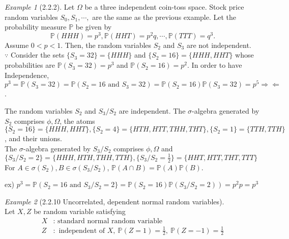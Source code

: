 \documentclass[12pt]{report}
\renewcommand{\1}{\mathbb{1}}
\theoremstyle{break}
\theoremstyle{newdef}
\theoremstyle{remark}
\newtheorem*{exmp}{Example} %
\begin{document}
\begin{appendices}
\vspace{5mm}

\begin{exmp}[2.2.2]
Let $\Omega$ be a three independent coin-toss space.
Stock price random variables $S_0, S_1, \cdots,$ are the same as the previous example.
Let the probability measure $\mathbb{P}$ be given by
$$\mathbb{P}(HHH) = p^3, \mathbb{P}(HHT) = p^2q, \cdots, \mathbb{P}(TTT) = q^3.$$
Assume $0 < p < 1$.
Then, the random variables $S_2$ and $S_3$ are not independent.\\
$\because$ Consider the sets $\{S_3 = 32\} = \{ HHH \}$ and $\{S_2 = 16\} = \{HHH, HHT \}$ whose probabilities are
$\mathbb{P}(S_3 = 32) = p^3$ and $\mathbb{P}(S_2 = 16) = p^2$.
In order to have Independence, $p^3 = \mathbb{P}(S_3 = 32) = \mathbb{P}(S_2 = 16 \text{ and } S_3 = 32) = \mathbb{P}(S_2 = 16)\mathbb{P}(S_3 = 32) = p^5\Rightarrow\!\Leftarrow$.

The random variables $S_2$ and $S_3/S_2$ are independent.
The $\sigma$-algebra generated by $S_2$ comprises $\phi, \Omega$, the atoms\\
$\{S_2 = 16\} = \{ HHH, HHT\}
, \{S_2=  4\} = \{ HTH, HTT, THH, THT\}
, \{S_2 = 1\} = \{TTH, TTH\}$, and their unions.\\

The $\sigma$-algebra generated by $S_3/S_2$ comprises $\phi, \Omega$ and\\
$\{S_3/S_2 = 2\} = \{HHH, HTH, THH, TTH\}
, \{S_3/S_2 = \frac{1}{2} \} = \{ HHT, HTT, THT, TTT\}$\\

For $A \in \sigma(S_2), B \in \sigma(S_3/S_2)$,
$\mathbb{P}(A \cap B) = \mathbb{P}(A)\mathbb{P}(B)$.

ex) $p^3 = \mathbb{P}(S_2 = 16 \text{ and } S_3/S_2 = 2\} = \mathbb{P}(S_2 = 16)\mathbb{P}(S_3/S_2 = 2)) = p^2 p = p^3$

\end{exmp}

\vspace{5mm}

\begin{exmp}[2.2.10 Uncorrelated, dependent normal random variables]
\leavevmode\\
Let $X, Z$ be random variable satisfying
$$
\begin{aligned}
X&: \text{ standard normal random variable}\\
Z&: \text{ independent of } X,\ \mathbb{P}(Z = 1) = \frac{1}{2},\ \mathbb{P}(Z = -1) = \frac{1}{2}
\end{aligned}
$$


\end{exmp}
\end{appendices}
\end{document}
